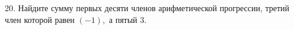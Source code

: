 20. Найдите сумму первых десяти членов арифметической прогрессии, третий член которой равен $(-1),$ а пятый $3.$\\
